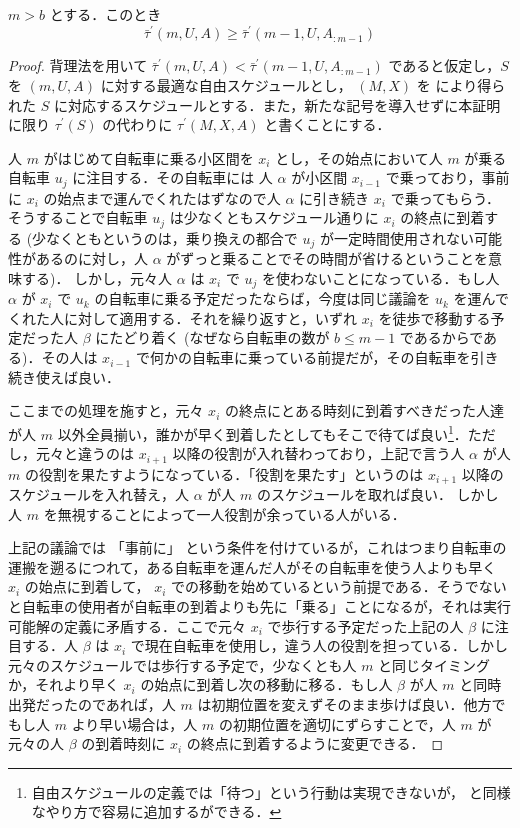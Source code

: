 \begin{lemma}\label{lemma:fsabs-lower-bound-recursive}
  $m > b$ とする．このとき
  \begin{equation}
    \bar\tau^{\prime}(m, U, A) \geq \bar\tau^\prime(m - 1, U, A_{:m-1})
  \end{equation}
\end{lemma}
\begin{proof}
  背理法を用いて $\bar\tau^{\prime}(m, U, A) < \bar\tau^\prime(m - 1, U, A_{:m-1})$ であると仮定し，$S$ を $(m, U, A)$ に対する最適な自由スケジュールとし， $(M, X)$ を により得られた $S$ に対応するスケジュールとする．また，新たな記号を導入せずに本証明に限り $\tau^\prime(S)$ の代わりに $\tau^\prime(M, X, A)$ と書くことにする．

  人 $m$ がはじめて自転車に乗る小区間を $x_i$ とし，その始点において人 $m$ が乗る自転車 $u_j$ に注目する．その自転車には 人 $\alpha$ が小区間 $x_{i - 1}$ で乗っており，事前に $x_i$ の始点まで運んでくれたはずなので人 $\alpha$ に引き続き $x_i$ で乗ってもらう．そうすることで自転車 $u_j$ は少なくともスケジュール通りに $x_i$ の終点に到着する (少なくともというのは，乗り換えの都合で $u_j$ が一定時間使用されない可能性があるのに対し，人 $\alpha$ がずっと乗ることでその時間が省けるということを意味する)． しかし，元々人 $\alpha$ は $x_i$ で $u_j$ を使わないことになっている．もし人 $\alpha$ が $x_i$ で $u_k$ の自転車に乗る予定だったならば，今度は同じ議論を $u_k$ を運んでくれた人に対して適用する．それを繰り返すと，いずれ $x_i$ を徒歩で移動する予定だった人 $\beta$ にたどり着く (なぜなら自転車の数が $b \leq m - 1$ であるからである)．その人は $x_{i - 1}$ で何かの自転車に乗っている前提だが，その自転車を引き続き使えば良い．

ここまでの処理を施すと，元々 $x_i$ の終点にとある時刻に到着すべきだった人達が人 $m$ 以外全員揃い，誰かが早く到着したとしてもそこで待てば良い\footnote{自由スケジュールの定義では「待つ」という行動は実現できないが，  と同様なやり方で容易に追加するができる．}．ただし，元々と違うのは $x_{i + 1}$ 以降の役割が入れ替わっており，上記で言う人 $\alpha$ が人 $m$ の役割を果たすようになっている．「役割を果たす」というのは $x_{i + 1}$ 以降のスケジュールを入れ替え，人 $\alpha$ が人 $m$ のスケジュールを取れば良い． しかし人 $m$ を無視することによって一人役割が余っている人がいる．

上記の議論では 「事前に」 という条件を付けているが，これはつまり自転車の運搬を遡るにつれて，ある自転車を運んだ人がその自転車を使う人よりも早く $x_i$ の始点に到着して， $x_i$ での移動を始めているという前提である．そうでないと自転車の使用者が自転車の到着よりも先に「乗る」ことになるが，それは実行可能解の定義に矛盾する．ここで元々 $x_i$ で歩行する予定だった上記の人 $\beta$ に注目する．人 $\beta$ は $x_i$ で現在自転車を使用し，違う人の役割を担っている．しかし元々のスケジュールでは歩行する予定で，少なくとも人 $m$ と同じタイミングか，それより早く $x_i$ の始点に到着し次の移動に移る．もし人 $\beta$ が人 $m$ と同時出発だったのであれば，人 $m$ は初期位置を変えずそのまま歩けば良い．他方でもし人 $m$ より早い場合は，人 $m$ の初期位置を適切にずらすことで，人 $m$ が元々の人 $\beta$ の到着時刻に $x_i$ の終点に到着するように変更できる．


\end{proof}
